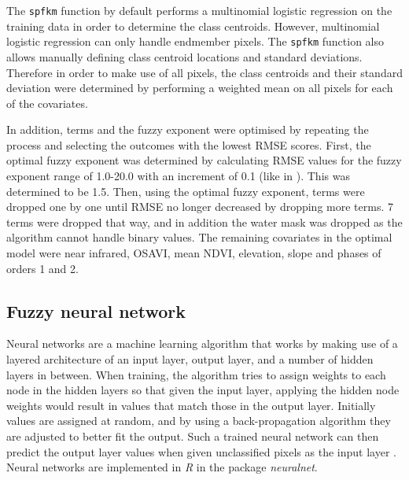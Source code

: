 \documentclass[a4paper,12pt]{scrbook}
\begin{document}
The \texttt{spfkm} function by default performs a multinomial logistic regression on the training data in order to determine the class centroids. However, multinomial logistic regression can only handle endmember pixels. The \texttt{spfkm} function also allows manually defining class centroid locations and standard deviations. Therefore in order to make use of all pixels, the class centroids and their standard deviation were determined by performing a weighted mean on all pixels for each of the covariates.

In addition, terms and the fuzzy exponent were optimised by repeating the process and selecting the outcomes with the lowest RMSE scores.  First, the optimal fuzzy exponent was determined by calculating RMSE values for the fuzzy exponent range of 1.0-20.0 with an increment of 0.1 (like in \citet{Okeke2006fuzzyexponent}). This was determined to be 1.5. Then, using the optimal fuzzy exponent, terms were dropped one by one until RMSE no longer decreased by dropping more terms. 7 terms were dropped that way, and in addition the water mask was dropped as the algorithm cannot handle binary values. The remaining covariates in the optimal model were near infrared, OSAVI, mean NDVI, elevation, slope and phases of orders 1 and 2.

\subsection{Fuzzy neural network}

Neural networks are a machine learning algorithm that works by making use of a layered architecture of an input layer, output layer, and a number of hidden layers in between. When training, the algorithm tries to assign weights to each node in the hidden layers so that given the input layer, applying the hidden node weights would result in values that match those in the output layer. Initially values are assigned at random, and by using a back-propagation algorithm they are adjusted to better fit the output. Such a trained neural network can then predict the output layer values when given unclassified pixels as the input layer \citep{foody1997fuzzynnet}. Neural networks are implemented in \textit{R} in the package \textit{neuralnet}.
\end{document}
